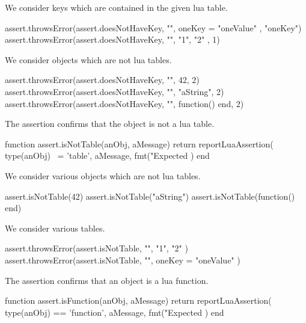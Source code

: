 
We consider keys which are contained in the given lua table.

\startLuaTest
  assert.throwsError(assert.doesNotHaveKey, "",
    { oneKey = "oneValue" }, "oneKey")
  assert.throwsError(assert.doesNotHaveKey, "",
    { "1", "2" }, 1)
\stopLuaTest
\stopTestCase


We consider objects which are not lua tables.

\startLuaTest
  assert.throwsError(assert.doesNotHaveKey, "", 42, 2)
  assert.throwsError(assert.doesNotHaveKey, "", "aString", 2)
  assert.throwsError(assert.doesNotHaveKey, "",
    function() end, 2)
\stopLuaTest
\stopTestCase

\stopTestSuite


The  assertion confirms that the object is not a 
lua table. 

\startLuaCode
function assert.isNotTable(anObj, aMessage)
  return reportLuaAssertion(
    type(anObj) ~= 'table',
    aMessage,
    fmt("Expected %
  )
end
\stopLuaCode


We consider various objects which are not lua tables.

\startLuaTest
  assert.isNotTable(42)
  assert.isNotTable("aString")
  assert.isNotTable(function() end)
\stopLuaTest
\stopTestCase


We consider various tables.

\startLuaTest
  assert.throwsError(assert.isNotTable, "", { "1", "2" })
  assert.throwsError(assert.isNotTable, "", { oneKey = "oneValue" })
\stopLuaTest
\stopTestCase

\stopTestSuite


The  assertion confirms that an object is a lua 
function. 

\startLuaCode
function assert.isFunction(anObj, aMessage)
  return reportLuaAssertion(
    type(anObj) == 'function',
    aMessage,
    fmt("Expected %
  )
end
\stopLuaCode

